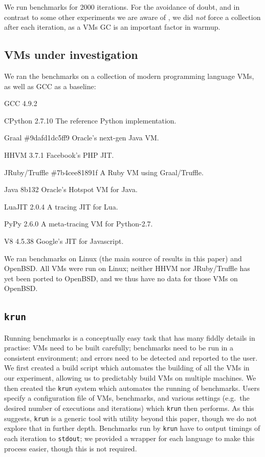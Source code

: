 \documentclass[10pt,preprint]{sigplanconf}
\newcommand{\krun}{\texttt{krun}\xspace}
\begin{document}
We run benchmarks for 2000 iterations. For the avoidance of doubt, and in
contrast to some other experiments we are aware of , we did
\emph{not} force a collection after each iteration, as a VMs GC is an important
factor in warmup.


\subsection{VMs under investigation}

We ran the benchmarks on a collection of modern programming language VMs,
as well as GCC as a baseline:
\begin{description*}
\item[GCC 4.9.2 \laurie{bencher6 is running 4.9.3. should we upgrade the others?}]
\item[CPython 2.7.10] The reference Python implementation.
\item[Graal \#9dafd1dc5ff9] Oracle's next-gen Java VM. 
\item[HHVM 3.7.1] Facebook's PHP JIT.
\item[JRuby/Truffle \#7b4cee81891f] A Ruby VM using Graal/Truffle.
\item[Java 8b132 \laurie{will be 8u45b14}] Oracle's Hotspot VM for Java.
\item[LuaJIT 2.0.4] A tracing JIT for Lua.
\item[PyPy 2.6.0] A meta-tracing VM for Python-2.7.
\item[V8 4.5.38 \laurie{will be 4.8.90 or later}] Google's JIT for Javascript.
\end{description*}
We ran benchmarks on Linux (the main source of results in this paper) and
OpenBSD. All VMs were run on Linux; neither HHVM nor JRuby/Truffle has yet been
ported to OpenBSD, and we thus have no data for those VMs on OpenBSD.


\subsection{\krun}

Running benchmarks is a conceptually easy task that has many fiddly details in
practise: VMs need to be built carefully; benchmarks need to be run in a consistent
environment; and errors need to be detected and reported to the user. We first created
a build script which automates the building of all the VMs in our experiment, allowing
us to predictably build VMs on multiple machines. We
then created the \krun system which automates the running of benchmarks. Users specify a configuration file of VMs, benchmarks, and various settings (e.g.~the desired number of executions and iterations) which \krun then performs. As this suggests, \krun is a generic tool with utility beyond this paper, though we do not explore that in further depth. Benchmarks run by \krun have to output timings of each iteration to \texttt{stdout}; we provided a wrapper for each language to make this process easier, though this is not required.
\end{document}
